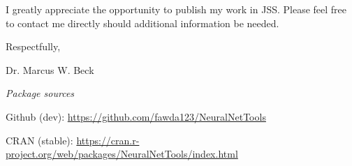 \documentclass[a4paper,12pt]{article}
\begin{document}
I greatly appreciate the opportunity to publish my work in JSS.  Please feel free to contact me directly should additional information be needed.

\vspace{0.1in}

\hspace{4.5in}Respectfully,

\hspace{4.5in}Dr. Marcus W. Beck

{\it Package sources}

Github (dev): \url{https://github.com/fawda123/NeuralNetTools}

CRAN (stable): \url{https://cran.r-project.org/web/packages/NeuralNetTools/index.html}
\end{document}
